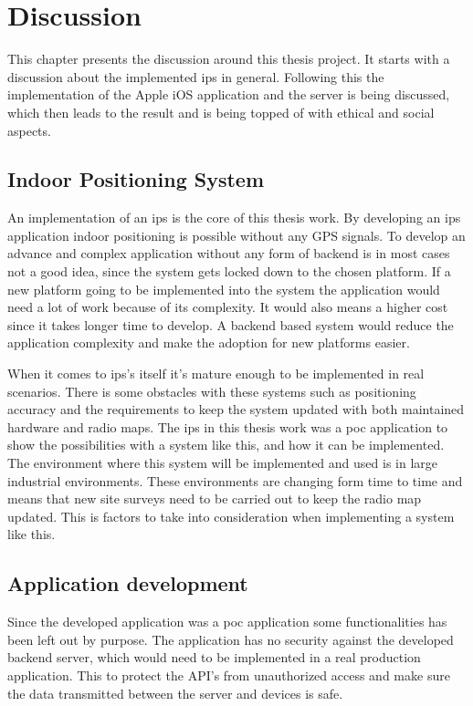 \chapter{Discussion} \label{discussion}
This chapter presents the discussion around this thesis project.
It starts with a discussion about the implemented \acrfull{ips} in general.
Following this the implementation of the Apple iOS application and the server is being discussed, which then leads to the result and is being topped of with ethical and social aspects.


\section{Indoor Positioning System}\label{sec:discussionIps}
An implementation of an \acrshort{ips} is the core of this thesis work.
By developing an \acrshort{ips} application indoor positioning is possible without any GPS signals.
To develop an advance and complex application without any form of backend is in most cases not a good idea, since the system gets locked down to the chosen platform.
If a new platform going to be implemented into the system the application would need a lot of work because of its complexity.
It would also means a higher cost since it takes longer time to develop.
A backend based system would reduce the application complexity and make the adoption for new platforms easier.

\bigskip

When it comes to \acrshort{ips}'s itself it's mature enough to be implemented in real scenarios.
There is some obstacles with these systems such as positioning accuracy and the requirements to keep the system updated with both maintained hardware and radio maps.
The \acrshort{ips} in this thesis work was a \acrfull{poc} application to show the possibilities with a system like this, and how it can be implemented.
The environment where this system will be implemented and used is in large industrial environments.
These environments are changing form time to time and means that new site surveys need to be carried out to keep the radio map updated.
This is factors to take into consideration when implementing a system like this.


\section{Application development}\label{sec:}
Since the developed application was a \acrshort{poc} application some functionalities has been left out by purpose.
The application has no security against the developed backend server, which would need to be implemented in a real production application.
This to protect the API's from unauthorized access and make sure the data transmitted between the server and devices is safe.

